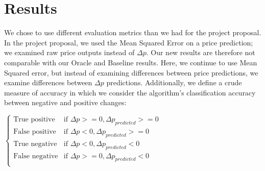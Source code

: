 \documentclass[10pt]{article}
\begin{document}
\section*{ Results}
 We chose to use different evaluation metrics than we had for the project proposal. In the project proposal, we used the Mean Squared Error on a price prediction; we examined raw price outputs instead of $\Delta p$. Our new results are therefore not comparable with our Oracle and Baseline results.
 	Here, we continue to use Mean Squared error, but instead of examining differences between price predictions, we examine differences between $\Delta p$ predictions. Additionally, we define a crude measure of accuracy in which we consider the algorithm’s classification accuracy between negative and positive changes: 
 	
$ 	 \begin{cases} \text{True positive} &\mbox{if } \Delta p >= 0, \Delta p_{predicted} >= 0 \\ 
\text{False positive} &\mbox{if } \Delta p < 0, \Delta p_{predicted} >= 0 \\ 
\text{True negative} &\mbox{if } \Delta p < 0, \Delta p_{predicted} < 0 \\ 
\text{False negative} &\mbox{if } \Delta p >= 0, \Delta p_{predicted} < 0 \\ 
 	 \end{cases}$ 
 	
 
 
 
 
\end{document}
